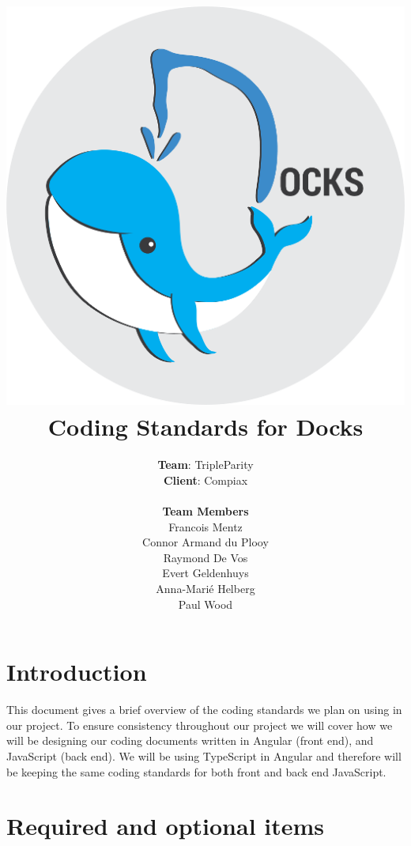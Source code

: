 \documentclass[a4paper]{article}
\title{
	\vspace{-1.5cm}
	\includegraphics[scale=0.7]{docks_round_512.png}
	\\[1cm]
	Coding Standards for Docks}
\author{\textbf{Team}: TripleParity\\
\textbf{Client}: Compiax\\
\\
\textbf{Team Members}\\
Francois Mentz\\
Connor Armand du Plooy\\
Raymond De Vos\\
Evert Geldenhuys\\
Anna-Marié Helberg\\
Paul Wood}
\date{}
\begin{document}
\maketitle



\section{Introduction}

This document gives a brief overview of the coding standards we plan on using in our project. 
To ensure consistency throughout our project we will cover how we will be designing our coding 
documents written in Angular (front end), and JavaScript (back end). We will be using TypeScript 
in Angular and therefore will be keeping the same coding standards for both front and back end 
JavaScript.

\section{Required and optional items}
\end{document}
